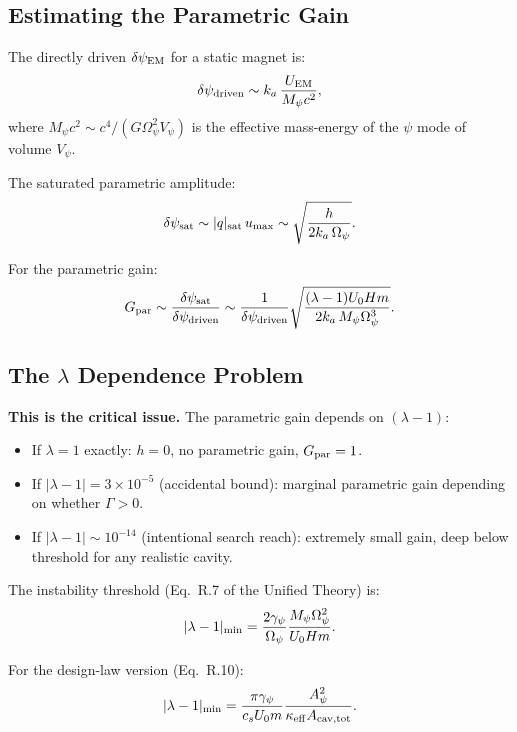 \documentclass[11pt]{article}
\newcommand{\ka}{k_a}
\begin{document}
\subsection{Estimating the Parametric Gain}

The directly driven $\delta\psi_{\rm EM}$ for a static magnet is:
\begin{equation}
\delta\psi_{\rm driven} \sim \ka\,\frac{U_{\rm EM}}{M_\psi c^2},
\end{equation}
where $M_\psi c^2 \sim c^4/(G\Omega_\psi^2 V_\psi)$ is the effective
mass-energy of the $\psi$ mode of volume $V_\psi$.

The saturated parametric amplitude:
\begin{equation}
\delta\psi_{\rm sat} \sim |q|_{\rm sat}\,u_{\rm max}
  \sim \sqrt{\frac{h}{2\ka\,\Omega_\psi}}.
\end{equation}

For the parametric gain:
\begin{equation}\label{eq:gain-estimate}
G_{\rm par} \sim \frac{\delta\psi_{\rm sat}}{\delta\psi_{\rm driven}}
  \sim \frac{1}{\delta\psi_{\rm driven}}
    \sqrt{\frac{(\lambda - 1) U_0 H m}{2\ka\,M_\psi\Omega_\psi^3}}.
\end{equation}

\subsection{The $\lambda$ Dependence Problem}

\textbf{This is the critical issue.} The parametric gain depends on
$(\lambda - 1)$:
\begin{itemize}
\item If $\lambda = 1$ exactly: $h = 0$, no parametric gain, $G_{\rm par} = 1$.
\item If $|\lambda - 1| = 3 \times 10^{-5}$ (accidental bound): marginal
  parametric gain depending on whether $\Gamma > 0$.
\item If $|\lambda - 1| \sim 10^{-14}$ (intentional search reach): extremely
  small gain, deep below threshold for any realistic cavity.
\end{itemize}

The instability threshold (Eq.~R.7 of the Unified Theory) is:
\begin{equation}
|\lambda - 1|_{\rm min} = \frac{2\gamma_\psi}{\Omega_\psi}
  \frac{M_\psi\Omega_\psi^2}{U_0 H m}.
\end{equation}

For the design-law version (Eq.~R.10):
\begin{equation}
|\lambda - 1|_{\rm min} = \frac{\pi\gamma_\psi}{c_s U_0 m}
  \frac{A_\psi^2}{\kappa_{\rm eff} A_{\rm cav,tot}}.
\end{equation}
\end{document}
